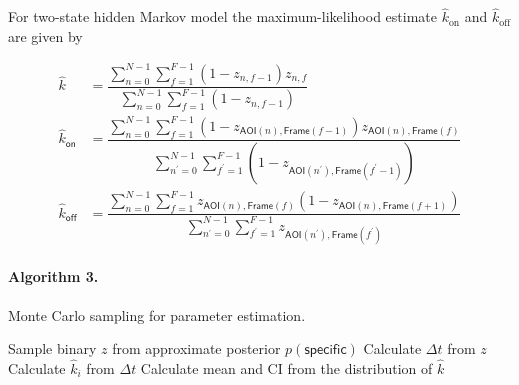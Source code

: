 For two-state hidden Markov model the maximum-likelihood estimate $\hat{k}_\mathrm{on}$ and $\hat{k}_\mathrm{off}$ are given by

\begin{subequations}
\begin{align}
    \hat{k} &= \dfrac{\sum_{n=0}^{N-1} \sum_{f=1}^{F-1}(1 - z_{n,f-1})z_{n,f}}{\sum_{n=0}^{N-1} \sum_{f=1}^{F-1} (1 - z_{n, f-1})} \\
    \hat{k}_\mathsf{on} &= \dfrac{\sum_{n=0}^{N-1} \sum_{f=1}^{F-1}\left( 1 - z_{\mathsf{AOI}(n),\mathsf{Frame}(f-1)} \right) z_{\mathsf{AOI}(n),\mathsf{Frame}(f)}}{\sum_{n^\prime=0}^{N-1} \sum_{f^\prime=1}^{F-1} \left(1 - z_{\mathsf{AOI} (n^\prime), \mathsf{Frame}( f^\prime-1)} \right)} \\
    \hat{k}_\mathsf{off} &= \dfrac{\sum_{n=0}^{N-1} \sum_{f=1}^{F-1} z_{\mathsf{AOI}(n),\mathsf{Frame}(f)} \left( 1 - z_{\mathsf{AOI}(n),\mathsf{Frame}(f+1)} \right) }{\sum_{n^\prime=0}^{N-1} \sum_{f^\prime=1}^{F-1} z_{\mathsf{AOI} (n^\prime), \mathsf{Frame}( f^\prime)} }
\end{align}
\end{subequations}

\paragraph{Algorithm 3.} Monte Carlo sampling for parameter estimation. \\
\begin{algorithmic}[1]
    \State Sample binary $z$ from approximate posterior $p(\mathsf{specific})$
    \State Calculate $\Delta t$ from $z$
    \State Calculate $\hat{k}_i$ from $\Delta t$
\EndFor{}
\State Calculate mean and CI from the distribution of $\hat{k}$
\end{algorithmic}


